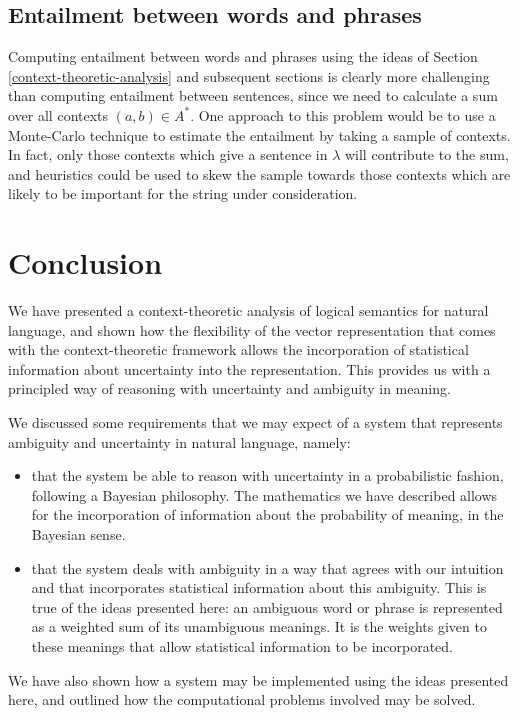 \subsection{Entailment between words and phrases}

Computing entailment between words and phrases using the ideas of Section \ref{context-theoretic-analysis} and subsequent sections is clearly more challenging than computing entailment between sentences, since we need to calculate a sum over all contexts $(a,b) \in A^*$. One approach to this problem would be to use a Monte-Carlo technique to estimate the entailment by taking a sample of contexts. In fact, only those contexts which give a sentence in $\lambda$ will contribute to the sum, and heuristics could be used to skew the sample towards those contexts which are likely to be important for the string under consideration.

\section{Conclusion}

We have presented a context-theoretic analysis of logical semantics for natural language, and shown how the flexibility of the vector representation that comes with the context-theoretic framework allows the incorporation of statistical information about uncertainty into the representation. This provides us with a principled way of reasoning with uncertainty and ambiguity in meaning.

We discussed some requirements that we may expect of a system that represents ambiguity and uncertainty in natural language, namely:
\begin{itemize}
\item that the system be able to reason with uncertainty in a probabilistic fashion, following a Bayesian philosophy. The mathematics we have described allows for the incorporation of information about the probability of meaning, in the Bayesian sense.
\item that the system deals with ambiguity in a way that agrees with our intuition and that incorporates statistical information about this ambiguity. This is true of the ideas presented here: an ambiguous word or phrase is represented as a weighted sum of its unambiguous meanings. It is the weights given to these meanings that allow statistical information to be incorporated.
\end{itemize}

We have also shown how a system may be implemented using the ideas presented here, and outlined how the computational problems involved may be solved.

